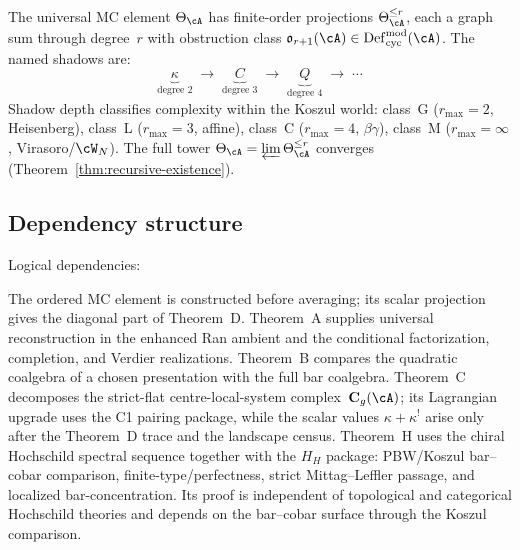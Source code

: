 The universal MC element $\Theta_\cA$ has finite-order
projections $\Theta_\cA^{\le r}$, each a graph sum through
degree~$r$ with obstruction class
$\mathfrak{o}_{r+1}(\cA) \in \mathrm{Def}_{\mathrm{cyc}}^{\mathrm{mod}}(\cA)$.
The named shadows are:
\[
\underbrace{\kappa}_{\text{degree 2}}
\;\to\;
\underbrace{C}_{\text{degree 3}}
\;\to\;
\underbrace{Q}_{\text{degree 4}}
\;\to\; \cdots
\]
Shadow depth classifies complexity within the Koszul world:
class~G ($r_{\max} = 2$, Heisenberg), class~L ($r_{\max} = 3$,
affine), class~C ($r_{\max} = 4$, $\beta\gamma$), class~M
($r_{\max} = \infty$, Virasoro/$\cW_N$). The full tower
$\Theta_\cA = \varprojlim \Theta_\cA^{\le r}$ converges
(Theorem~\ref{thm:recursive-existence}).

\subsection*{Dependency structure}

Logical dependencies:
\begin{center}
\end{center}
The ordered MC element is constructed before averaging; its scalar
projection gives the diagonal part of Theorem~D. Theorem~A supplies
universal reconstruction in the enhanced Ran ambient and the
conditional factorization, completion, and Verdier realizations.
Theorem~B compares the quadratic coalgebra of a chosen presentation
with the full bar coalgebra. Theorem~C decomposes the strict-flat
centre-local-system complex~$\mathbf C_g(\cA)$; its Lagrangian upgrade
uses the C1 pairing package, while the scalar values
$\kappa+\kappa^!$ arise only after the Theorem~D trace and the landscape
census.
Theorem~H uses the chiral Hochschild spectral sequence together with
the \(H_H\) package: PBW/Koszul bar--cobar comparison,
finite-type/perfectness, strict Mittag--Leffler passage, and localized
bar-concentration. Its proof is independent of
topological and categorical Hochschild theories and depends on the
bar--cobar surface through the Koszul comparison.

